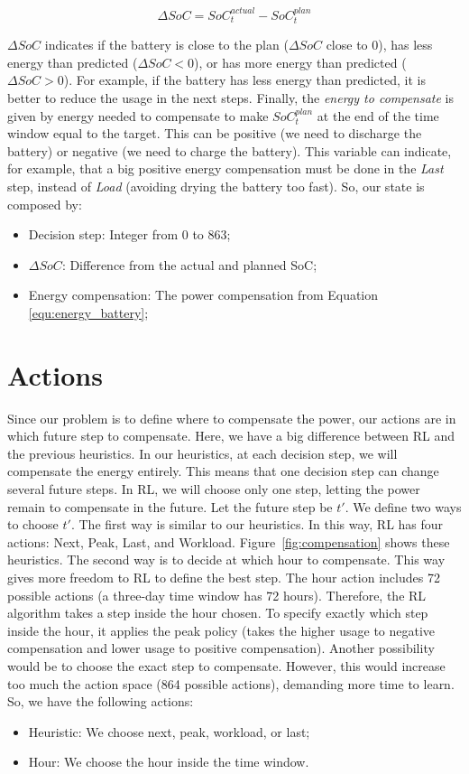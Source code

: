 \begin{equation}
    \Delta SoC = SoC^{actual}_{t} - SoC^{plan}_{t}
\end{equation}

$\Delta SoC$ indicates if the battery is close to the plan ($\Delta SoC$ close to 0), has less energy than predicted ($\Delta SoC < 0$), or has more energy than predicted ($\Delta SoC > 0$). For example, if the battery has less energy than predicted, it is better to reduce the usage in the next steps. Finally, the \textit{energy to compensate} is given by energy needed to compensate to make $SoC^{plan}_{t}$ at the end of the time window equal to the target. This can be positive (we need to discharge the battery) or negative (we need to charge the battery). This variable can indicate, for example, that a big positive energy compensation must be done in the \emph{Last} step, instead of \emph{Load} (avoiding drying the battery too fast). So, our state is composed by:

\begin{itemize}
    \item Decision step: Integer from 0 to 863;
    \item \(\Delta SoC\): Difference from the actual and planned SoC;
    \item Energy compensation: The power compensation from Equation \ref{equ:energy_battery};
\end{itemize}

\section{Actions}

Since our problem is to define where to compensate the power, our actions are in which future step to compensate. Here, we have a big difference between RL and the previous heuristics. In our heuristics, at each decision step, we will compensate the energy entirely. This means that one decision step can change several future steps. In RL, we will choose only one step, letting the power remain to compensate in the future. Let the future step be $t'$. We define two ways to choose $t'$. The first way is similar to our heuristics. In this way, RL has four actions: Next, Peak, Last, and Workload. Figure~\ref{fig:compensation} shows these heuristics. The second way is to decide at which hour to compensate. This way gives more freedom to RL to define the best step. The hour action includes 72 possible actions (a three-day time window has 72 hours). Therefore, the RL algorithm takes a step inside the hour chosen. To specify exactly which step inside the hour, it applies the peak policy (takes the higher usage to negative compensation and lower usage to positive compensation). Another possibility would be to choose the exact step to compensate. However, this would increase too much the action space (864 possible actions), demanding more time to learn. So, we have the following actions:
\begin{itemize}
    \item Heuristic: We choose next, peak, workload, or last;
    \item Hour: We choose the hour inside the time window.
\end{itemize}

